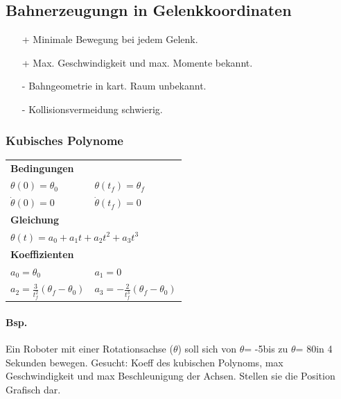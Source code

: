 \subsection{Bahnerzeugungn in Gelenkkoordinaten}
\begin{multicols}{2}
    \begin{itemize}
        \item[+] Minimale Bewegung bei jedem Gelenk.
        \item[+] Max. Geschwindigkeit und max. Momente bekannt.
    \end{itemize}

    \begin{itemize}
        \item[-] Bahngeometrie in kart. Raum unbekannt.
        \item[-] Kollisionsvermeidung schwierig.
    \end{itemize}
\end{multicols}
\clearpage
\subsubsection{Kubisches Polynome}
\begin{tabular}{ll}
\multicolumn{2}{l}{\textbf{Bedingungen}}\\
$ \theta(0)=\theta_0 $& $ \theta(t_f) = \theta_f$\\ 
$ \dot{\theta}(0)=0 $& $ \dot{\theta}(t_f) = 0$\\
\multicolumn{2}{l}{\textbf{Gleichung}}\\
\multicolumn{2}{l}{$ \theta(t)=a_0 + a_1t + a_2t^2+a_3t^3$}\\
\multicolumn{2}{l}{\textbf{Koeffizienten}}\\
$a_0= \theta_0$&$a_1=0 $\\
$a_2 = \frac{3}{t_f^2}(\theta_f - \theta_0) $&$a_3=-\frac{2}{t_f^3}(\theta_f-\theta_0) $\\
\end{tabular}
\paragraph{Bsp.}
Ein Roboter mit einer Rotationsachse ($\theta$) soll sich von $\theta$= -5\textdegree bis zu $\theta$= 80\textdegree in 4 Sekunden bewegen.\newline
Gesucht: Koeff des kubischen Polynoms, max Geschwindigkeit und max Beschleunigung der Achsen.
Stellen sie die Position Grafisch dar.

